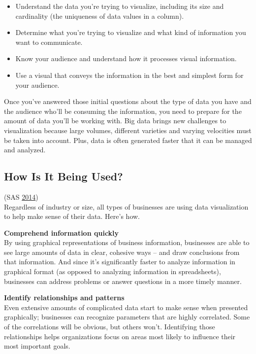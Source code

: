 \documentclass[]{book}
\providecommand{\tightlist}{%
  \setlength{\itemsep}{0pt}\setlength{\parskip}{0pt}}
\begin{document}
\begin{itemize}
\tightlist
\item
  Understand the data you're trying to visualize, including its size and cardinality (the uniqueness of data values in a column).
\item
  Determine what you're trying to visualize and what kind of information you want to communicate.
\item
  Know your audience and understand how it processes visual information.
\item
  Use a visual that conveys the information in the best and simplest form for your audience.
\end{itemize}

Once you've answered those initial questions about the type of data you have and the audience who'll be consuming the information, you need to prepare for the amount of data you'll be working with. Big data brings new challenges to visualization because large volumes, different varieties and varying velocities must be taken into account. Plus, data is often generated faster that it can be managed and analyzed.

\hypertarget{how-is-it-being-used}{%
\subsection{How Is It Being Used?}\label{how-is-it-being-used}}

(SAS \protect\hyperlink{ref-why_dataviz_matters}{2014})\\
Regardless of industry or size, all types of businesses are using data visualization to help make sense of their data. Here's how.

\textbf{Comprehend information quickly}\\
By using graphical representations of business information, businesses are able to see large amounts of data in clear, cohesive ways -- and draw conclusions from that information. And since it's significantly faster to analyze information in graphical format (as opposed to analyzing information in spreadsheets), businesses can address problems or answer questions in a more timely manner.

\textbf{Identify relationships and patterns}\\
Even extensive amounts of complicated data start to make sense when presented graphically; businesses can recognize parameters that are highly correlated. Some of the correlations will be obvious, but others won't. Identifying those relationships helps organizations focus on areas most likely to influence their most important goals.
\end{document}
